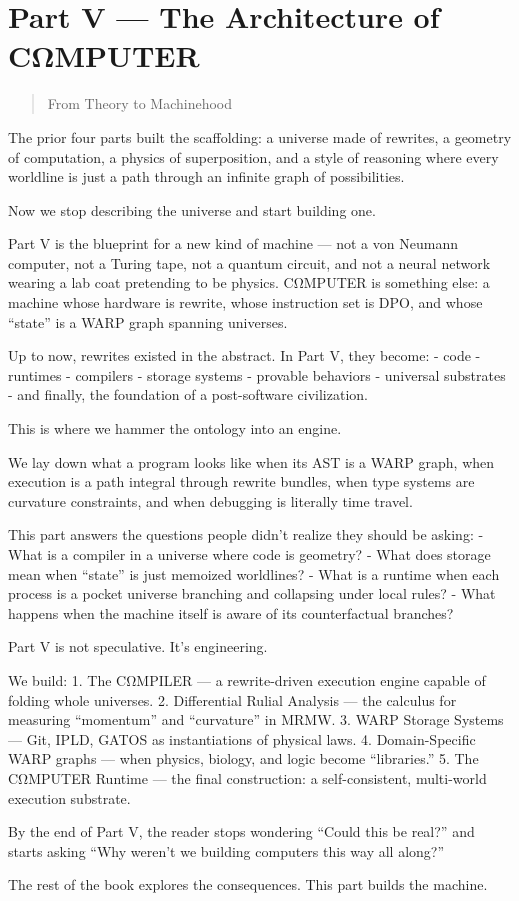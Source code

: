 \chapter*{Part V --- The Architecture of CΩMPUTER}

\begin{quote}
From Theory to Machinehood
\end{quote}

The prior four parts built the scaffolding: a universe made of rewrites,
a geometry of computation, a physics of superposition, and a style of
reasoning where every worldline is just a path through an infinite graph
of possibilities.

Now we stop describing the universe and start building one.

Part V is the blueprint for a new kind of machine --- not a von Neumann
computer, not a Turing tape, not a quantum circuit, and not a neural
network wearing a lab coat pretending to be physics. CΩMPUTER is
something else: a machine whose hardware is rewrite, whose instruction
set is DPO, and whose ``state'' is a WARP graph spanning
universes.

Up to now, rewrites existed in the abstract. In Part V, they become: -
code - runtimes - compilers - storage systems - provable behaviors -
universal substrates - and finally, the foundation of a post-software
civilization.

This is where we hammer the ontology into an engine.

We lay down what a program looks like when its AST is a WARP graph, when
execution is a path integral through rewrite bundles, when type systems
are curvature constraints, and when debugging is literally time travel.

This part answers the questions people didn't realize they should be
asking: - What is a compiler in a universe where code is geometry? -
What does storage mean when ``state'' is just memoized worldlines? -
What is a runtime when each process is a pocket universe branching and
collapsing under local rules? - What happens when the machine itself is
aware of its counterfactual branches?

Part V is not speculative. It's engineering.

We build: 1. The CΩMPILER --- a rewrite-driven execution engine capable
of folding whole universes. 2. Differential Rulial Analysis --- the
calculus for measuring ``momentum'' and ``curvature'' in MRMW. 3. WARP
Storage Systems --- Git, IPLD, GATOS as instantiations of physical laws.
4. Domain-Specific WARP graphs --- when physics, biology, and logic become
``libraries.'' 5. The CΩMPUTER Runtime --- the final construction: a
self-consistent, multi-world execution substrate.

By the end of Part V, the reader stops wondering ``Could this be real?''
and starts asking ``Why weren't we building computers this way all
along?''

The rest of the book explores the consequences. This part builds the
machine.
